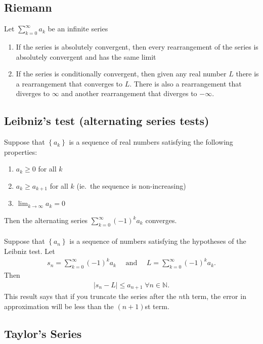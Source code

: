 \documentclass{report}
\begin{document}
		\subsection{Riemann}

			Let $\displaystyle\sum_{k=0}^\infty a_k$ be an infinite series
			\begin{enumerate}
				\item If the series is absolutely convergent, then every rearrangement of the series is absolutely convergent and has the same limit
				\item If the series is conditionally convergent, then given any real number $L$ there is a rearrangement that converges to $L$. There is also a rearrangement that diverges to $\infty$ and another rearrangement that diverges to $-\infty$.
			\end{enumerate}

		\subsection{Leibniz's test (alternating series tests)}

			Suppose that $\left\{a_k\right\}$ is a sequence of real numbers satisfying the following properties:
			\begin{enumerate}
				\item $a_k \geq 0$ for all $k$
				\item $a_k \geq a_{k+1}$ for all $k$ (ie.\ the sequence is non-increasing)
				\item $\displaystyle\lim_{k\to \infty} a_k = 0$
			\end{enumerate}
			Then the alternating series $\sum_{k=0}^\infty (-1)^k a_k$ converges.
			\\ \\
			Suppose that $\left\{a_n \right\}$ is a sequence of numbers satisfying the hypotheses of the Leibniz test. Let
			\begin{align*}
				s_n = \sum_{k=0}^\infty (-1)^k a_k \quad \text{ and } \quad L = \sum_{k=0}^\infty (-1)^k a_k.
			\end{align*}
			Then
			\begin{align*}
				|s_n - L| \leq a_{n+1} \; \forall n \in \mathbb{N}.
			\end{align*}
			This result says that if you truncate the series after the $n$th term, the error in approximation will be less than the $(n+1)$st term.

		\subsection{Taylor's Series}
			
\end{document}
